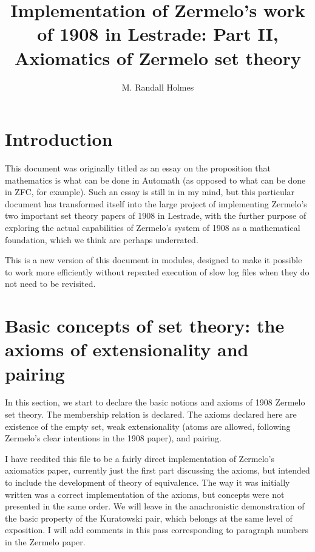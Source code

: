 \documentclass[12pt]{article}
\title{Implementation of Zermelo's work of 1908 in Lestrade:  Part II, Axiomatics of Zermelo set theory}
\author{M. Randall Holmes}
\begin{document}
\maketitle

\section{Introduction}
 
This document was originally titled as an essay on the proposition that mathematics is what can be done in Automath (as opposed to what can be done in ZFC, for example).  Such an essay is still in in my mind, but this particular document has transformed itself into the large project of implementing Zermelo's two important set theory papers of 1908 in Lestrade, with the further purpose of exploring the actual capabilities of Zermelo's system of 1908 as a mathematical foundation, which we think are perhaps underrated.

This is a new version of this document in modules, designed to make it possible to work more efficiently without repeated execution of slow log files when they do not need to be revisited.

\section{Basic concepts of set theory:  the axioms of extensionality and pairing}

In this section, we start to declare the basic notions and axioms of 1908 Zermelo set theory.  The membership relation is declared.  The axioms declared here are existence of the empty set, weak extensionality (atoms are allowed, following Zermelo's clear intentions in the 1908 paper), and pairing.

I have reedited this file to be a fairly direct implementation of Zermelo's axiomatics paper, currently just the first part discussing the axioms, but intended to include the development of theory of equivalence.  The way it was initially written was a correct implementation of the axioms, but concepts were not presented in the same order.  We will leave in the anachronistic demonstration of the basic property of the Kuratowski pair, which belongs at the same level of exposition.  I will add comments in this pass corresponding to paragraph  numbers in the Zermelo paper.
\end{document}
